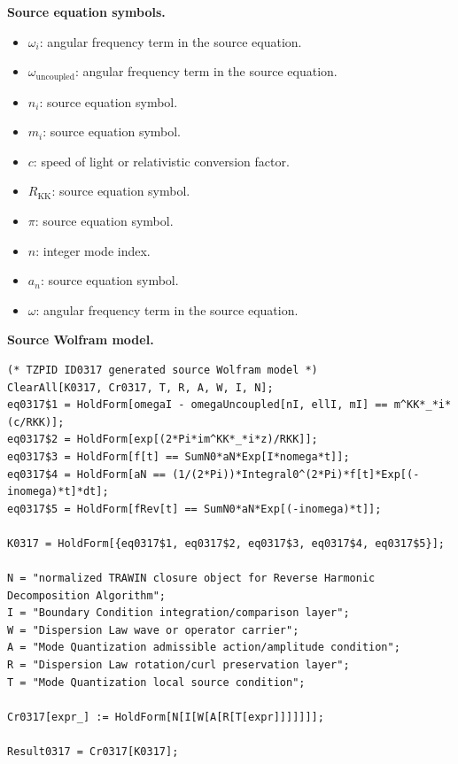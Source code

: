 \begin{minipage}[t]{0.49\linewidth}
\begingroup
\small
\raggedright
\textbf{Source equation symbols.}\par
\begin{itemize}[leftmargin=1.35em,itemsep=1pt,topsep=1pt,parsep=0pt]
    \item $\omega_i$: angular frequency term in the source equation.
    \item $\omega_{\mathrm{uncoupled}}$: angular frequency term in the source equation.
    \item $n_i$: source equation symbol.
    \item $m_i$: source equation symbol.
    \item $c$: speed of light or relativistic conversion factor.
    \item $R_{\mathrm{KK}}$: source equation symbol.
    \item $\pi$: source equation symbol.
    \item $n$: integer mode index.
    \item $a_n$: source equation symbol.
    \item $\omega$: angular frequency term in the source equation.
\end{itemize}
\endgroup
\end{minipage}\hfill
\begin{minipage}[t]{0.47\linewidth}
\begingroup
\scriptsize
\raggedright
\textbf{Source Wolfram model.}\par
\begin{Verbatim}[fontsize=\tiny,breaklines=true,breakanywhere=true]
(* TZPID ID0317 generated source Wolfram model *)
ClearAll[K0317, Cr0317, T, R, A, W, I, N];
eq0317$1 = HoldForm[omegaI - omegaUncoupled[nI, ellI, mI] == m^KK*_*i*(c/RKK)];
eq0317$2 = HoldForm[exp[(2*Pi*im^KK*_*i*z)/RKK]];
eq0317$3 = HoldForm[f[t] == SumN0*aN*Exp[I*nomega*t]];
eq0317$4 = HoldForm[aN == (1/(2*Pi))*Integral0^(2*Pi)*f[t]*Exp[(-inomega)*t]*dt];
eq0317$5 = HoldForm[fRev[t] == SumN0*aN*Exp[(-inomega)*t]];

K0317 = HoldForm[{eq0317$1, eq0317$2, eq0317$3, eq0317$4, eq0317$5}];

N = "normalized TRAWIN closure object for Reverse Harmonic Decomposition Algorithm";
I = "Boundary Condition integration/comparison layer";
W = "Dispersion Law wave or operator carrier";
A = "Mode Quantization admissible action/amplitude condition";
R = "Dispersion Law rotation/curl preservation layer";
T = "Mode Quantization local source condition";

Cr0317[expr_] := HoldForm[N[I[W[A[R[T[expr]]]]]]];

Result0317 = Cr0317[K0317];
\end{Verbatim}
\endgroup
\end{minipage}

